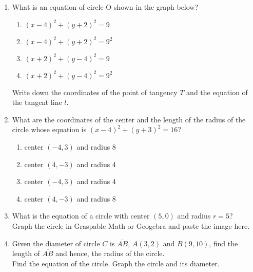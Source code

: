 \begin{enumerate}
\newpage
\item What is an equation of circle O shown in the graph below?
  \begin{center}
  \end{center}
  \begin{multicols}{2}
    \begin{enumerate}
      \item $(x-4)^2+(y+2)^2=9$
      \item $(x-4)^2+(y+2)^2=9^2$
      \item $(x+2)^2+(y-4)^2=9$
      \item $(x+2)^2+(y-4)^2=9^2$
    \end{enumerate}
  \end{multicols}
  Write down the coordinates of the point of tangency $T$ and the equation of the tangent line $l$.
     
\item What are the coordinates of the center and the length of the radius of the circle whose equation is $(x-4)^2+(y+3)^2=16$?
    \begin{enumerate}
      \item center $(-4,3)$ and radius 8
      \item center $(4,-3)$ and radius 4
      \item center $(-4,3)$ and radius 4
      \item center $(4,-3)$ and radius 8
    \end{enumerate}

\item What is the equation of a circle with center $(5,0)$ and radius $r=5$?\\[0.5cm]
  Graph the circle in Graspable Math or Geogebra and paste the image here.

\item Given the diameter of circle $C$ is $\overline{AB}$, $A(3,2)$ and $B(9,10)$, find the length of $\overline{AB}$ and hence, the radius of the circle.\\[0.25cm]
Find the equation of the circle. Graph the circle and its diameter.


\end{enumerate}
